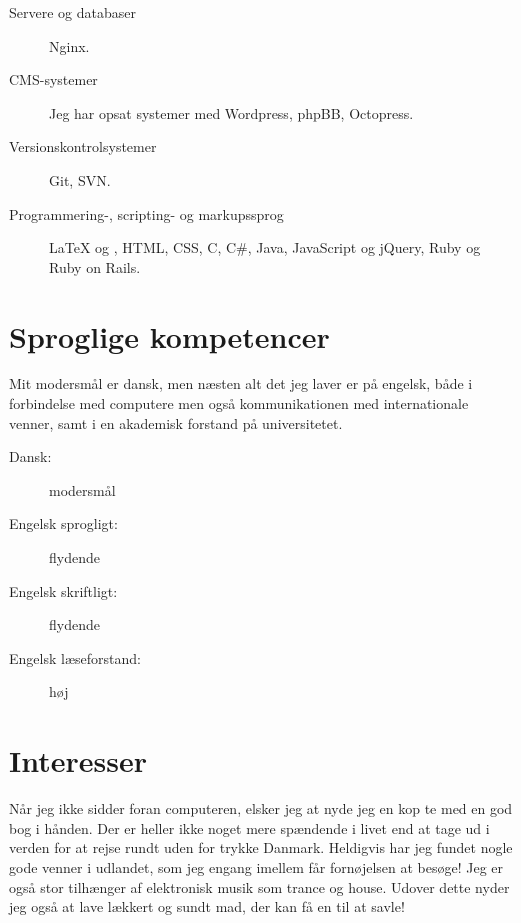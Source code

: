 \documentclass[margin,line,a4paper]{resume}
\begin{document}
\begin{resume}
\begin{description}
  \item[Servere og databaser] Nginx. 

  \item[CMS-systemer] Jeg har opsat systemer med Wordpress, phpBB,
    Octopress.

  \item[Versionskontrolsystemer] Git, SVN.

  \item[Programmering-, scripting- og markupssprog] \LaTeX{} og
  \XeTeX{}, HTML, CSS, C, C\#, Java, JavaScript og jQuery, Ruby og Ruby
  on Rails.

\end{description}

\section{\mysidestyle Sproglige kompetencer}
Mit modersmål er dansk, men næsten alt det jeg laver er på engelsk,
både i forbindelse med computere men også kommunikationen med
internationale venner, samt i en akademisk forstand på universitetet.

\begin{description}
  \item[Dansk:] modersmål
  \item[Engelsk sprogligt:] flydende
  \item[Engelsk skriftligt:] flydende
  \item[Engelsk læseforstand:] høj
\end{description}

\section{\mysidestyle Interesser}

Når jeg ikke sidder foran computeren, elsker jeg at nyde jeg en kop
te med en god bog i hånden. Der er heller ikke noget mere spændende
i livet end at tage ud i verden for at rejse rundt uden for trykke
Danmark. Heldigvis har jeg fundet nogle gode venner i udlandet, som jeg
engang imellem får fornøjelsen at besøge! Jeg er også stor tilhænger af
elektronisk musik som trance og house. Udover dette nyder jeg også at
lave lækkert og sundt mad, der kan få en til at savle!

\end{resume}
\end{document}
